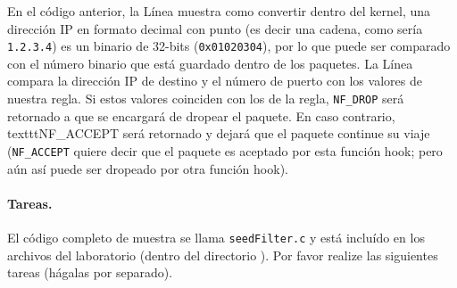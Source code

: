 En el código anterior, la Línea  muestra como convertir dentro del kernel, una dirección IP en formato decimal con punto (es decir una cadena, como sería \texttt{1.2.3.4}) es un binario de 32-bits (\texttt{0x01020304}), por lo que puede ser comparado con el número binario que está guardado dentro de los paquetes.
La Línea  compara la dirección IP de destino y el número de puerto con los valores de nuestra regla. Si estos valores coinciden con los de la regla,  \texttt{NF\_DROP} será retornado a \netfilter que se encargará de dropear el paquete. En caso contrario, texttt{NF\_ACCEPT} será retornado y \netfilter dejará que el paquete continue su viaje (\texttt{NF\_ACCEPT} quiere decir que el paquete es aceptado por esta función hook; pero aún así puede ser dropeado por otra función hook).

\paragraph{Tareas.} El código completo de muestra se llama \texttt{seedFilter.c} y está incluído en los archivos del laboratorio (dentro del directorio ). Por favor realize las siguientes tareas (hágalas por separado).


